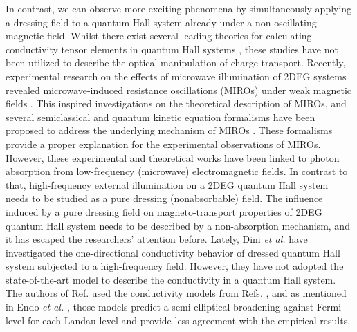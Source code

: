 \documentclass[
 reprint,
 amsmath,amssymb,
 aps,
 prb,
]{revtex4-2}
\begin{document}
In contrast, we can observe more exciting phenomena by simultaneously applying a dressing field to a quantum Hall system already under a non-oscillating magnetic field.
Whilst there exist several leading theories for calculating conductivity tensor elements in quantum Hall systems \cite{ando74_1,ando82,endo09}, these studies  have not been utilized to describe the optical manipulation of charge transport.
{\color{Red}
Recently, experimental research on the effects of microwave illumination of 2DEG systems revealed microwave-induced resistance oscillations (MIROs) under weak magnetic fields \cite{zudov01,mani02,zudov03,mani04}.
This inspired investigations on the theoretical description of MIROs, and several semiclassical and quantum kinetic equation formalisms have been proposed to address the underlying mechanism of MIROs \cite{durst03,dmitriev03,dmitriev05,dmitriev09}. These formalisms provide a proper explanation for the experimental observations of MIROs. However, these experimental and theoretical works have been linked to photon absorption from low-frequency (microwave) electromagnetic fields.
In contrast to that, high-frequency external illumination on a 2DEG quantum Hall system needs to be studied as a pure dressing (nonabsorbable) field.
The influence induced by a pure dressing field on
magneto-transport properties of 2DEG quantum Hall system needs to be described by a non-absorption mechanism, and it has escaped the researchers’ attention before.
Lately, Dini \textit{et al.} \cite{dini16} have investigated the one-directional conductivity behavior of dressed quantum Hall system subjected to a high-frequency field.}
However, they have not adopted the state-of-the-art model to describe the conductivity in a quantum Hall system.
{\color{Red}
The authors of Ref. \cite{dini16} used the conductivity models from Refs. \cite{ando74_1,ando82}, and as mentioned in Endo \textit{et al.} \cite{endo09}, those models predict a semi-elliptical broadening against Fermi level for each Landau level and provide less agreement with the empirical results.}
\end{document}
